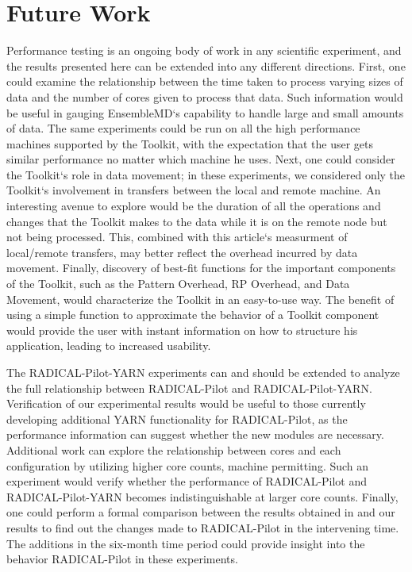 \documentclass[]{article}
\begin{document}
\section{Future Work}
	Performance testing is an ongoing body of work in any scientific experiment, and the results presented here can be extended into any different directions. First, one could examine the relationship between the time taken to process varying sizes of data and the number of cores given to process that data. Such information would be useful in gauging EnsembleMD`s capability to handle large and small amounts of data. The same experiments could be run on all the high performance machines supported by the Toolkit, with the expectation that the user gets similar performance no matter which machine he uses. Next, one could consider the Toolkit`s role in data movement; in these experiments, we considered only the Toolkit`s involvement in transfers between the local and remote machine. An interesting avenue to explore would be the duration of all the operations and changes that the Toolkit makes to the data while it is on the remote node but not being processed. This, combined with this article`s measurment of local/remote transfers, may better reflect the overhead incurred by data movement. Finally, discovery of best-fit functions for the important components of the Toolkit, such as the Pattern Overhead, RP Overhead, and Data Movement, would characterize the Toolkit in an easy-to-use way. The benefit of using a simple function to approximate the behavior of a Toolkit component would provide the user with instant information on how to structure his application, leading to increased usability.

	The RADICAL-Pilot-YARN experiments can and should be extended to analyze the full relationship between RADICAL-Pilot and RADICAL-Pilot-YARN. Verification of our experimental results would be useful to those currently developing additional YARN functionality for RADICAL-Pilot, as the performance information can suggest whether the new modules are necessary. Additional work can explore the relationship between cores and each configuration by utilizing higher core counts, machine permitting. Such an experiment would verify whether the performance of RADICAL-Pilot and RADICAL-Pilot-YARN becomes indistinguishable at larger core counts. Finally, one could perform a formal comparison between the results obtained in \cite{hadoop_paper} and our results to find out the changes made to RADICAL-Pilot in the intervening time. The additions in the six-month time period could provide insight into the behavior RADICAL-Pilot in these experiments.
\end{document}
